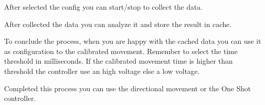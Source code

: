 After selected the config you can start/stop to collect the data.

\begin{Shaded}
\begin{Highlighting}[]
\end{Highlighting}
\end{Shaded}

After collected the data you can analyze it and store the result in
cache.

\begin{Shaded}
\begin{Highlighting}[]
\end{Highlighting}
\end{Shaded}

To conclude the process, when you are happy with the cached data you can
use it as configuration to the calibrated movement. Remember to select
the time threshold in milliseconds. If the calibrated movement time is
higher than threshold the controller use an high voltage else a low
voltage.

\begin{Shaded}
\begin{Highlighting}[]
\NormalTok{;}
\end{Highlighting}
\end{Shaded}

Completed this process you can use the directional movement or the One
Shot controller.

\begin{Shaded}
\begin{Highlighting}[]
\NormalTok{;}

\end{Highlighting}
\end{Shaded}

